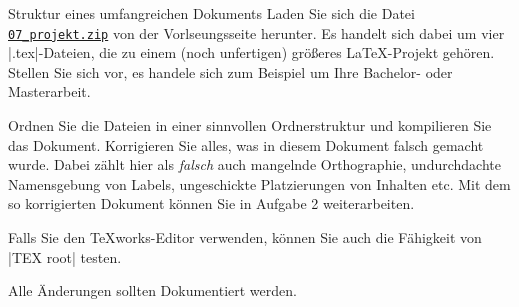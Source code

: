 \documentclass[
	vorläufig=false, 
	blattnr=7,
	ausgabe=2021-12-08,
	abgabe=2021-12-15,
	lösung=true,
	shortverb,
]{../tex/latexkurs-exercise}
\begin{document}
\begin{aufgabe}[6]{Struktur eines umfangreichen Dokuments}
	Laden Sie sich die Datei \href{http://latexkurs.github.io/exercises/07_projekt.zip}{\texttt{07\_projekt.zip}} von der Vorlseungsseite herunter. Es handelt sich dabei um vier |.tex|-Dateien, die zu einem (noch unfertigen) größeres \LaTeX-Projekt gehören. Stellen Sie sich vor, es handele sich zum Beispiel um Ihre Bachelor- oder Masterarbeit.
	
	Ordnen Sie die Dateien in einer sinnvollen Ordnerstruktur und kompilieren Sie das Dokument. Korrigieren Sie alles, was in diesem Dokument falsch gemacht wurde. Dabei zählt hier als \emph{falsch} auch mangelnde Orthographie, undurchdachte Namensgebung von Labels, ungeschickte Platzierungen von Inhalten etc. Mit dem so korrigierten Dokument können Sie in Aufgabe 2 weiterarbeiten.

	Falls Sie den \TeX works-Editor verwenden, können Sie auch die Fähigkeit von |TEX root| testen.

    Alle Änderungen sollten Dokumentiert werden.
	
\end{aufgabe}

\end{document}
